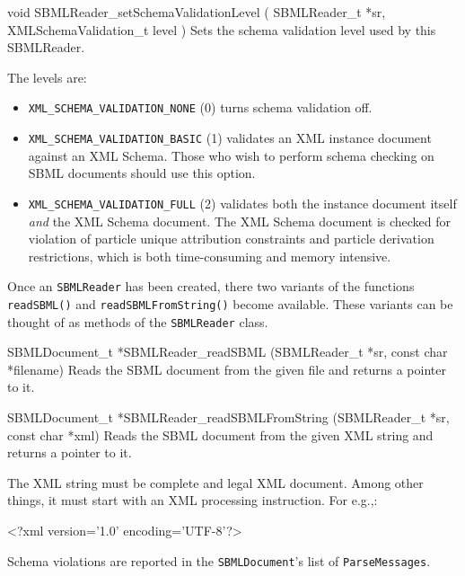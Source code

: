 \documentclass{sbmlmanual}
\begin{document}
\begin{methoddef}{void SBMLReader\_setSchemaValidationLevel ( SBMLReader\_t *sr,
XMLSchemaValidation\_t level )}
  Sets the schema validation level used by this SBMLReader.

  The levels are:
  \begin{itemize}
    \item \texttt{XML\_SCHEMA\_VALIDATION\_NONE} (0) turns schema
    validation off.

    \item \texttt{XML\_SCHEMA\_VALIDATION\_BASIC} (1) validates an XML
    instance document against an XML Schema.  Those who wish to
    perform schema checking on SBML documents should use this option.

    \item \texttt{XML\_SCHEMA\_VALIDATION\_FULL} (2) validates both
    the instance document itself \emph{and} the XML Schema document.
    The XML Schema document is checked for violation of particle
    unique attribution constraints and particle derivation
    restrictions, which is both time-consuming and memory intensive.
  \end{itemize}
\end{methoddef}


Once an \texttt{SBMLReader} has been created, there two variants of the
functions \texttt{readSBML()} and \texttt{readSBMLFromString()} become
available.  These variants can be thought of as methods of the
\texttt{SBMLReader} class.


\begin{methoddef}{SBMLDocument\_t *SBMLReader\_readSBML (SBMLReader\_t *sr,
const char *filename)}
  Reads the SBML document from the given file and returns a pointer to
  it.
\end{methoddef}

\begin{methoddef}{SBMLDocument\_t *SBMLReader\_readSBMLFromString (SBMLReader\_t *sr, const char *xml)}
  Reads the SBML document from the given XML string and returns a pointer
  to it.

  The XML string must be complete and legal XML document.  Among other
  things, it must start with an XML processing instruction.  For e.g.,:
  \begin{example}
    <?xml version='1.0' encoding='UTF-8'?>
  \end{example}
\end{methoddef}


Schema violations are reported in the \texttt{SBMLDocument}'s list of
\texttt{ParseMessages}.
\end{document}
